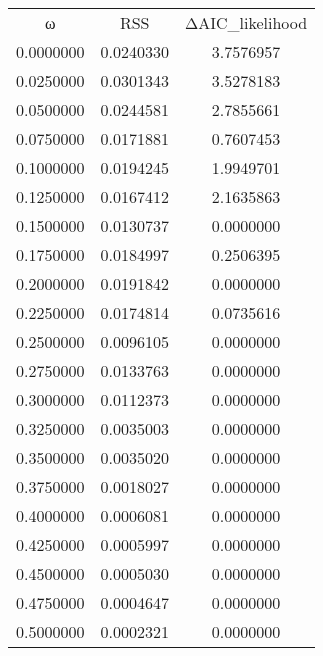 \begin{tabular}{ccc}
ω & RSS & ΔAIC_likelihood\\
0.0000000 & 0.0240330 & 3.7576957\\
0.0250000 & 0.0301343 & 3.5278183\\
0.0500000 & 0.0244581 & 2.7855661\\
0.0750000 & 0.0171881 & 0.7607453\\
0.1000000 & 0.0194245 & 1.9949701\\
0.1250000 & 0.0167412 & 2.1635863\\
0.1500000 & 0.0130737 & 0.0000000\\
0.1750000 & 0.0184997 & 0.2506395\\
0.2000000 & 0.0191842 & 0.0000000\\
0.2250000 & 0.0174814 & 0.0735616\\
0.2500000 & 0.0096105 & 0.0000000\\
0.2750000 & 0.0133763 & 0.0000000\\
0.3000000 & 0.0112373 & 0.0000000\\
0.3250000 & 0.0035003 & 0.0000000\\
0.3500000 & 0.0035020 & 0.0000000\\
0.3750000 & 0.0018027 & 0.0000000\\
0.4000000 & 0.0006081 & 0.0000000\\
0.4250000 & 0.0005997 & 0.0000000\\
0.4500000 & 0.0005030 & 0.0000000\\
0.4750000 & 0.0004647 & 0.0000000\\
0.5000000 & 0.0002321 & 0.0000000\\
\end{tabular}
